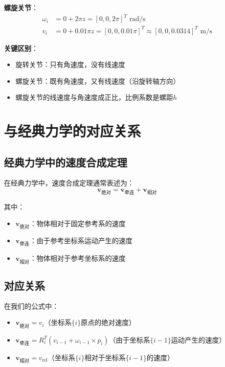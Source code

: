 \documentclass[12pt,a4paper]{article}
\begin{document}
\textbf{螺旋关节}：
\begin{align}
\omega_i &= 0 + 2\pi z = [0, 0, 2\pi]^T \text{ rad/s} \\
v_i &= 0 + 0.01\pi z = [0, 0, 0.01\pi]^T \approx [0, 0, 0.0314]^T \text{ m/s}
\end{align}

\textbf{关键区别}：
\begin{itemize}
\item 旋转关节：只有角速度，没有线速度
\item 螺旋关节：既有角速度，又有线速度（沿旋转轴方向）
\item 螺旋关节的线速度与角速度成正比，比例系数是螺距$h$
\end{itemize}

\section{与经典力学的对应关系}

\subsection{经典力学中的速度合成定理}

在经典力学中，速度合成定理通常表述为：
\begin{equation}
\mathbf{v}_{\text{绝对}} = \mathbf{v}_{\text{牵连}} + \mathbf{v}_{\text{相对}}
\end{equation}

其中：
\begin{itemize}
\item $\mathbf{v}_{\text{绝对}}$：物体相对于固定参考系的速度
\item $\mathbf{v}_{\text{牵连}}$：由于参考坐标系运动产生的速度
\item $\mathbf{v}_{\text{相对}}$：物体相对于参考坐标系的速度
\end{itemize}

\subsection{对应关系}

在我们的公式中：
\begin{itemize}
\item $\mathbf{v}_{\text{绝对}} = v_i$（坐标系$\{i\}$原点的绝对速度）
\item $\mathbf{v}_{\text{牵连}} = R_i^T (v_{i-1} + \omega_{i-1} \times p_i)$（由于坐标系$\{i-1\}$运动产生的速度）
\item $\mathbf{v}_{\text{相对}} = v_{\text{rel}}$（坐标系$\{i\}$相对于坐标系$\{i-1\}$的速度）
\end{itemize}
\end{document}
